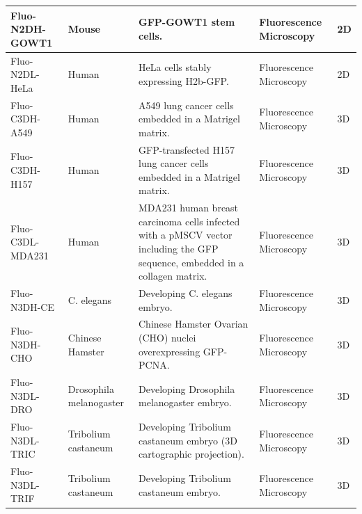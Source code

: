 \documentclass[./dissertation.tex]{subfiles}
\begin{document}
\begin{table}[!ht]
\begin{tabular}{|l|p{2.3cm}|p{5cm}|p{2.3cm}|p{2.3cm}|}
        Fluo-N2DH-GOWT1       & Mouse                   & GFP-GOWT1 stem cells.                                                                                                       & Fluorescence Microscopy                             & 2D                 \\ \hline
        Fluo-N2DL-HeLa        & Human                   & HeLa cells stably expressing H2b-GFP.                                                                                       & Fluorescence Microscopy                             & 2D                 \\ \hline
        Fluo-C3DH-A549        & Human                   & A549 lung cancer cells embedded in a Matrigel matrix.                                                                       & Fluorescence Microscopy                             & 3D                 \\ \hline
        Fluo-C3DH-H157        & Human                   & GFP-transfected H157 lung cancer cells embedded in a Matrigel matrix.                                                       & Fluorescence Microscopy                             & 3D                 \\ \hline
        Fluo-C3DL-MDA231      & Human                   & MDA231 human breast carcinoma cells infected with a pMSCV vector including the GFP sequence, embedded in a collagen matrix. & Fluorescence Microscopy                             & 3D                 \\ \hline
        Fluo-N3DH-CE          & C. elegans              & Developing C. elegans embryo.                                                                                               & Fluorescence Microscopy                             & 3D                 \\ \hline
        Fluo-N3DH-CHO         & Chinese Hamster         & Chinese Hamster Ovarian (CHO) nuclei overexpressing GFP-PCNA.                                                               & Fluorescence Microscopy                             & 3D                 \\ \hline
        Fluo-N3DL-DRO         & Drosophila melanogaster & Developing Drosophila melanogaster embryo.                                                                                  & Fluorescence Microscopy                             & 3D                 \\ \hline
        Fluo-N3DL-TRIC        & Tribolium castaneum     & Developing Tribolium castaneum embryo (3D cartographic projection).                                                         & Fluorescence Microscopy                             & 3D                 \\ \hline
        Fluo-N3DL-TRIF        & Tribolium castaneum     & Developing Tribolium castaneum embryo.                                                                                      & Fluorescence Microscopy                             & 3D                 \\ \hline
    \end{tabular}
\end{table}
\end{document}
